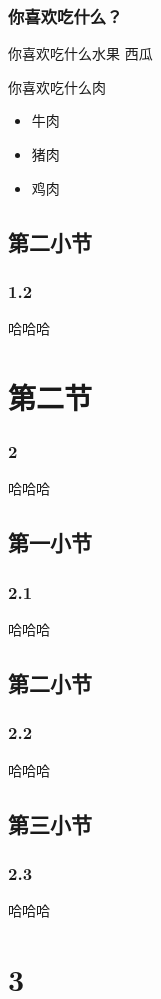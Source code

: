 \documentclass[UTF8,table]{ctexbeamer}
\begin{document}
\begin{frame}
	\frametitle{你喜欢\alert{吃什么}？}
	\begin{block}{你喜欢吃什么\alert{水果}}
		西瓜
	\end{block}
	\begin{block}{你喜欢吃什么肉}
		\begin{itemize}
		\item 牛肉
		\pause
		\item 猪肉
		\pause
		\item 鸡肉
	\end{itemize}
	\end{block}
\end{frame}

\subsection{第二小节}
\begin{frame}
	\frametitle{1.2}
	哈哈哈
\end{frame}


\section{第二节}
\begin{frame}
	\frametitle{2}
	哈哈哈
\end{frame}

\subsection{第一小节}
\begin{frame}
	\frametitle{2.1}
	哈哈哈
\end{frame}
\subsection{第二小节}
\begin{frame}
	\frametitle{2.2}
	哈哈哈
\end{frame}

\subsection{第三小节}
\begin{frame}
	\frametitle{2.3}
	哈哈哈
\end{frame}

\section{3}
\end{document}
